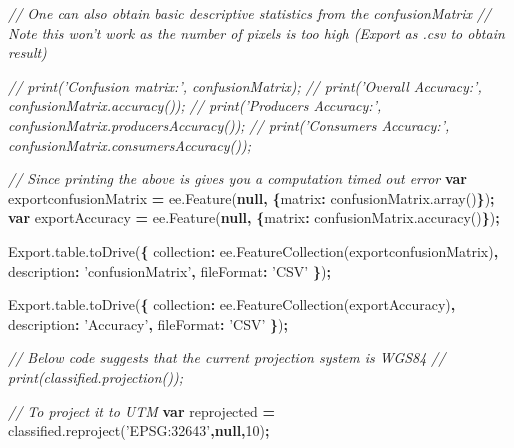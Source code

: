\documentclass[]{article}
\newenvironment{Shaded}{\begin{snugshade}}{\end{snugshade}}
\newcommand{\AttributeTok}[1]{\textcolor[rgb]{0.77,0.63,0.00}{#1}}
\newcommand{\CommentTok}[1]{\textcolor[rgb]{0.56,0.35,0.01}{\textit{#1}}}
\newcommand{\DataTypeTok}[1]{\textcolor[rgb]{0.13,0.29,0.53}{#1}}
\newcommand{\DecValTok}[1]{\textcolor[rgb]{0.00,0.00,0.81}{#1}}
\newcommand{\KeywordTok}[1]{\textcolor[rgb]{0.13,0.29,0.53}{\textbf{#1}}}
\newcommand{\NormalTok}[1]{#1}
\newcommand{\OperatorTok}[1]{\textcolor[rgb]{0.81,0.36,0.00}{\textbf{#1}}}
\newcommand{\StringTok}[1]{\textcolor[rgb]{0.31,0.60,0.02}{#1}}
\newcommand{\VariableTok}[1]{\textcolor[rgb]{0.00,0.00,0.00}{#1}}
\begin{document}
\begin{Shaded}
\begin{Highlighting}[numbers=left,,]
\CommentTok{// One can also obtain basic descriptive statistics from the confusionMatrix}
\CommentTok{// Note this won't work as the number of pixels is too high (Export as .csv to obtain result)}

\CommentTok{// print('Confusion matrix:', confusionMatrix);}
\CommentTok{// print('Overall Accuracy:', confusionMatrix.accuracy());}
\CommentTok{// print('Producers Accuracy:', confusionMatrix.producersAccuracy());}
\CommentTok{// print('Consumers Accuracy:', confusionMatrix.consumersAccuracy());}

\CommentTok{// Since printing the above is gives you a computation timed out error}
\KeywordTok{var}\NormalTok{ exportconfusionMatrix }\OperatorTok{=} \VariableTok{ee}\NormalTok{.}\AttributeTok{Feature}\NormalTok{(}\KeywordTok{null}\OperatorTok{,} \OperatorTok{\{}\DataTypeTok{matrix}\OperatorTok{:} \VariableTok{confusionMatrix}\NormalTok{.}\AttributeTok{array}\NormalTok{()}\OperatorTok{\}}\NormalTok{)}\OperatorTok{;} 
\KeywordTok{var}\NormalTok{ exportAccuracy }\OperatorTok{=} \VariableTok{ee}\NormalTok{.}\AttributeTok{Feature}\NormalTok{(}\KeywordTok{null}\OperatorTok{,} \OperatorTok{\{}\DataTypeTok{matrix}\OperatorTok{:} \VariableTok{confusionMatrix}\NormalTok{.}\AttributeTok{accuracy}\NormalTok{()}\OperatorTok{\}}\NormalTok{)}\OperatorTok{;} 

\VariableTok{Export}\NormalTok{.}\VariableTok{table}\NormalTok{.}\AttributeTok{toDrive}\NormalTok{(}\OperatorTok{\{}
  \DataTypeTok{collection}\OperatorTok{:} \VariableTok{ee}\NormalTok{.}\AttributeTok{FeatureCollection}\NormalTok{(exportconfusionMatrix)}\OperatorTok{,}
  \DataTypeTok{description}\OperatorTok{:} \StringTok{'confusionMatrix'}\OperatorTok{,}
  \DataTypeTok{fileFormat}\OperatorTok{:} \StringTok{'CSV'}
\OperatorTok{\}}\NormalTok{)}\OperatorTok{;}

\VariableTok{Export}\NormalTok{.}\VariableTok{table}\NormalTok{.}\AttributeTok{toDrive}\NormalTok{(}\OperatorTok{\{}
  \DataTypeTok{collection}\OperatorTok{:} \VariableTok{ee}\NormalTok{.}\AttributeTok{FeatureCollection}\NormalTok{(exportAccuracy)}\OperatorTok{,}
  \DataTypeTok{description}\OperatorTok{:} \StringTok{'Accuracy'}\OperatorTok{,}
  \DataTypeTok{fileFormat}\OperatorTok{:} \StringTok{'CSV'}
\OperatorTok{\}}\NormalTok{)}\OperatorTok{;}

\CommentTok{// Below code suggests that the current projection system is WGS84}
\CommentTok{// print(classified.projection());}

\CommentTok{// To project it to UTM}
\KeywordTok{var}\NormalTok{ reprojected }\OperatorTok{=} \VariableTok{classified}\NormalTok{.}\AttributeTok{reproject}\NormalTok{(}\StringTok{'EPSG:32643'}\OperatorTok{,}\KeywordTok{null}\OperatorTok{,}\DecValTok{10}\NormalTok{)}\OperatorTok{;}


\end{Highlighting}
\end{Shaded}
\end{document}

